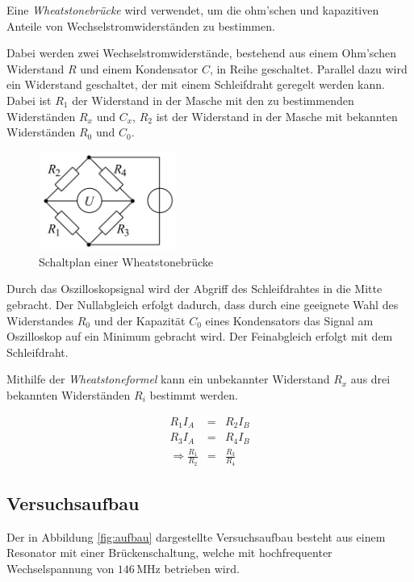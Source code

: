 \documentclass[12pt,a4paper]{scrartcl}
\numberwithin{equation}{section} %
\begin{document}
Eine \emph{Wheatstonebrücke} wird verwendet, um die ohm'schen und kapazitiven Anteile von Wechselstromwiderständen zu bestimmen.

Dabei werden zwei Wechselstromwiderstände, bestehend aus einem Ohm'schen Widerstand $R$ und einem Kondensator $C$, in Reihe geschaltet. Parallel dazu wird ein Widerstand geschaltet, der mit einem Schleifdraht geregelt werden kann. Dabei ist $R_1$ der Widerstand in der Masche mit den zu bestimmenden Widerständen $R_x$ und $C_x$, $R_2$ ist der Widerstand in der Masche mit bekannten Widerständen $R_0$ und $C_0$.

\begin{figure}[h!]
	\centering
	\includegraphics[width=0.4\textwidth]{../media/B1.5/WhBr_Diagonalbild.png}
	\caption{Schaltplan einer Wheatstonebrücke \cite{File:WhBr_Diagonalbild}}
\end{figure}

Durch das Oszilloskopsignal wird der Abgriff des Schleifdrahtes in die Mitte gebracht. Der Nullabgleich erfolgt dadurch, dass durch eine geeignete Wahl des Widerstandes $R_0$ und der Kapazität $C_0$ eines Kondensators das Signal am Oszilloskop auf ein Minimum gebracht wird. Der Feinabgleich erfolgt mit dem Schleifdraht.

Mithilfe der \emph{Wheatstoneformel} kann ein unbekannter Widerstand $R_x$ aus drei bekannten Widerständen $R_i$ bestimmt werden.

\begin{eqnarray}
    R_1 I_A &=& R_2 I_B \\
    R_3 I_A &=& R_4 I_B \\
    \Rightarrow \frac{R_1}{R_2} &=& \frac{R_3}{R_4}
\end{eqnarray}

\hypertarget{Versuchsaufbau}{\subsection{Versuchsaufbau}\label{Versuchsaufbau}}
Der in Abbildung \ref{fig:aufbau} dargestellte Versuchsaufbau besteht aus einem Resonator mit einer Brückenschaltung, welche mit hochfrequenter Wechselspannung von $146 \mathrm{\, MHz}$ betrieben wird.
\end{document}
